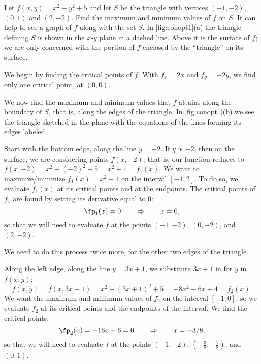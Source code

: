 \begin{example}\label{ex_conopt1}%
Let $f(x,y) = x^2-y^2+5$ and let $S$ be the triangle with vertices $(-1,-2)$, $(0,1)$ and $(2,-2)$. Find the maximum and minimum values of $f$ on $S$.
\solution
It can help to see a graph of $f$ along with the set $S$. In \autoref{fig:conopt1}(a) the triangle defining $S$ is shown in the $x$-$y$ plane in a dashed line. Above it is the surface of $f$; we are only concerned with the portion of $f$ enclosed by the ``triangle'' on its surface. 

We begin by finding the critical points of $f$. With $f_x = 2x$ and $f_y = -2y$, we find only one critical point, at $(0,0)$. 

We now find the maximum and minimum values that $f$ attains along the boundary of $S$, that is, along the edges of the triangle. In \autoref{fig:conopt1}(b) we see the triangle sketched in the plane with the equations of the lines forming its edges labeled. 

Start with the bottom edge, along the line $y=-2$. If $y$ is $-2$, then on the surface, we are considering points $f(x,-2)$; that is, our function reduces to $f(x,-2) = x^2-(-2)^2+5 = x^2+1=f_1(x)$. We want to maximize/minimize $f_1(x)=x^2+1$ on the interval $[-1,2]$. To do so, we evaluate $f_1(x)$ at its critical points and at the endpoints.  The critical points of $f_1$ are found by setting its derivative equal to 0:
\[\fp_1(x)=0\qquad \Rightarrow\qquad x=0,\]
so that we will need to evaluate $f$ at the points $(-1,-2)$, $(0,-2)$, and $(2,-2)$.

We need to do this process twice more, for the other two edges of the triangle.

Along the left edge, along the line $y=3x+1$, we substitute $3x+1$ in for $y$ in $f(x,y)$:
\[f(x,y) = f(x,3x+1) = x^2-(3x+1)^2+5 = -8x^2-6x+4 = f_2(x).\]
We want the maximum and minimum values of $f_2$ on the interval $[-1,0]$, so we evaluate $f_2$ at its critical points and the endpoints of the interval. We find the critical points:
\[\fp_2(x) = -16x-6=0 \qquad \Rightarrow \qquad x=-3/8,\]
so that we will need to evaluate $f$ at the points $(-1,-2)$, $(-\frac38,-\frac18)$, and $(0,1)$.


\end{example}
